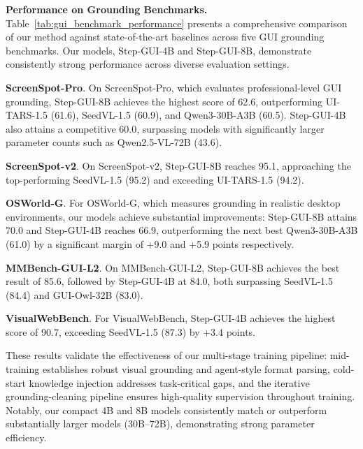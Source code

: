 \noindent\textbf{Performance on Grounding Benchmarks.}
Table~\ref{tab:gui_benchmark_performance} presents a comprehensive comparison of our method against state-of-the-art baselines across five GUI grounding benchmarks. Our models, Step-GUI-4B and Step-GUI-8B, demonstrate consistently strong performance across diverse evaluation settings.

\textbf{ScreenSpot-Pro}. On ScreenSpot-Pro, which evaluates professional-level GUI grounding, Step-GUI-8B achieves the highest score of 62.6, outperforming UI-TARS-1.5 (61.6), SeedVL-1.5 (60.9), and Qwen3-30B-A3B (60.5). Step-GUI-4B also attains a competitive 60.0, surpassing models with significantly larger parameter counts such as Qwen2.5-VL-72B (43.6).

\textbf{ScreenSpot-v2}. On ScreenSpot-v2, Step-GUI-8B reaches 95.1, approaching the top-performing SeedVL-1.5 (95.2) and exceeding UI-TARS-1.5 (94.2).

\textbf{OSWorld-G}. For OSWorld-G, which measures grounding in realistic desktop environments, our models achieve substantial improvements: Step-GUI-8B attains 70.0 and Step-GUI-4B reaches 66.9, outperforming the next best Qwen3-30B-A3B (61.0) by a significant margin of +9.0 and +5.9 points respectively.

\textbf{MMBench-GUI-L2}. On MMBench-GUI-L2, Step-GUI-8B achieves the best result of 85.6, followed by Step-GUI-4B at 84.0, both surpassing SeedVL-1.5 (84.4) and GUI-Owl-32B (83.0). 

\textbf{VisualWebBench}. For VisualWebBench, Step-GUI-4B achieves the highest score of 90.7, exceeding SeedVL-1.5 (87.3) by +3.4 points.

These results validate the effectiveness of our multi-stage training pipeline: mid-training establishes robust visual grounding and agent-style format parsing, cold-start knowledge injection addresses task-critical gaps, and the iterative grounding-cleaning pipeline ensures high-quality supervision throughout training. Notably, our compact 4B and 8B models consistently match or outperform substantially larger models (30B--72B), demonstrating strong parameter efficiency.

